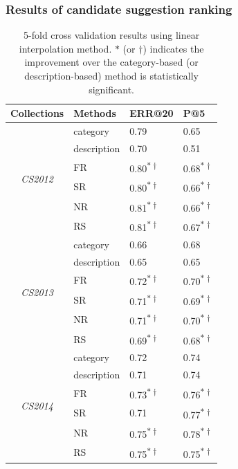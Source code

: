 \subsubsection{Results of candidate suggestion ranking}  \label{subsec:ranking_results}

\begin{table}[t]
\centering
\caption{ 5-fold cross validation results using linear interpolation method.
$\ast$ (or $\dagger$) indicates the improvement over the category-based (or description-based) method is statistically significant.
}

\label{table:li_results}
\renewcommand{\arraystretch}{1.2}

\begin{tabular}{ |c|l|l|l| }
\hline
Collections & Methods & ERR@20 & P@5 \\
\hline
\hline
\multirow{6}{*}{\em CS2012} & category & 0.79 & 0.65 \\
 & description & 0.70 & 0.51 \\ \cline{2-4}
 & FR & 0.80\textsuperscript{$\ast \dagger$} & 0.68\textsuperscript{$\ast \dagger$} \\
 & SR & 0.80\textsuperscript{$\ast \dagger$} & 0.66\textsuperscript{$\ast \dagger$} \\
 & NR & 0.81\textsuperscript{$\ast \dagger$} & 0.66\textsuperscript{$\ast \dagger$} \\
 & RS & 0.81\textsuperscript{$\ast \dagger$} & 0.67\textsuperscript{$\ast \dagger$} \\
\hline
\hline

\multirow{6}{*}{\em CS2013} & category & 0.66 & 0.68 \\
 & description & 0.65 & 0.65 \\ \cline{2-4}
 & FR & 0.72\textsuperscript{$\ast \dagger$} & 0.70\textsuperscript{$\ast \dagger$} \\
 & SR & 0.71\textsuperscript{$\ast \dagger$} & 0.69\textsuperscript{$\ast \dagger$} \\
 & NR & 0.71\textsuperscript{$\ast \dagger$} & 0.70\textsuperscript{$\ast \dagger$} \\
 & RS & 0.69\textsuperscript{$\ast \dagger$} & 0.68\textsuperscript{$\ast \dagger$} \\
\hline
\hline

\multirow{6}{*}{\em CS2014} & category & 0.72 & 0.74 \\
 & description & 0.71 & 0.74 \\ \cline{2-4}
 & FR & 0.73\textsuperscript{$\ast \dagger$} & 0.76\textsuperscript{$\ast \dagger$} \\
 & SR & 0.71 & 0.77\textsuperscript{$\ast \dagger$} \\
 & NR & 0.75\textsuperscript{$\ast \dagger$} & 0.78\textsuperscript{$\ast \dagger$} \\
 & RS & 0.75\textsuperscript{$\ast \dagger$} & 0.75\textsuperscript{$\ast \dagger$} \\
 \hline
\hline


\end{tabular}
\end{table}
